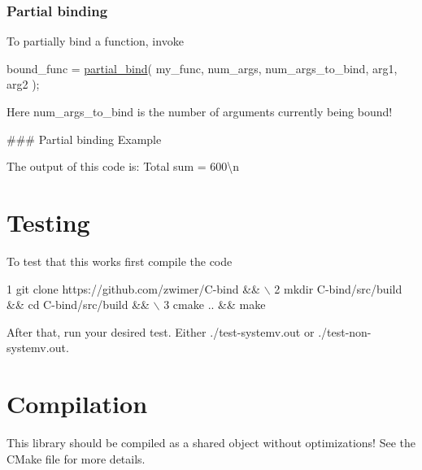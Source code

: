 \subsubsection*{Partial binding}

To partially bind a function, invoke 
\begin{DoxyCode}
bound\_func = \hyperlink{bind_8c_a749a103d16b748b8aecff011472a0881}{partial\_bind}( my\_func, num\_args, num\_args\_to\_bind, arg1, arg2 );
\end{DoxyCode}
 Here {\ttfamily num\+\_\+args\+\_\+to\+\_\+bind} is the number of arguments currently being bound!

\#\#\# Partial binding Example 
 The output of this code is\+: {\ttfamily Total sum = 600\textbackslash{}n} 



\section*{Testing}

To test that this works first compile the code 
\begin{DoxyCode}
1 git clone https://github.com/zwimer/C-bind && \(\backslash\)
2 mkdir C-bind/src/build && cd C-bind/src/build && \(\backslash\)
3 cmake .. && make
\end{DoxyCode}


After that, run your desired test. Either {\ttfamily ./test-\/systemv.out} or {\ttfamily ./test-\/non-\/systemv.out}.

\section*{Compilation}

This library should be compiled as a shared object without optimizations! See the {\ttfamily C\+Make} file for more details.

